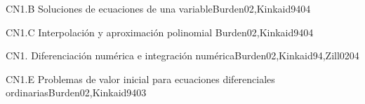 \begin{syllabus}
\begin{unit}{CN1.B Soluciones de ecuaciones de una variable}{Burden02,Kinkaid94}{0}{4}
\begin{topics}
      \item \CNONETopicIterative
   \end{topics}
   \begin{learningoutcomes}
      \item \CNONEObjONE
      \item \CNONEObjTWO
      \item \CNONEObjTHREE
      \item \CNONEObjFOUR
   \end{learningoutcomes}
\end{unit}

\begin{unit}{CN1.C Interpolación y aproximación polinomial }{Burden02,Kinkaid94}{0}{4}
\begin{topics}
      \item \CNONETopicCurve
   \end{topics}

   \begin{learningoutcomes}
      \item \CNONEObjONE
      \item \CNONEObjTWO
      \item \CNONEObjTHREE
      \item \CNONEObjFOUR
   \end{learningoutcomes}
\end{unit}

\begin{unit}{CN1. Diferenciación numérica e integración numérica}{Burden02,Kinkaid94,Zill02}{0}{4}
\begin{topics}
      \item \CNONETopicNumerical
      \item \CNONETopicExplicit
   \end{topics}

   \begin{learningoutcomes}
      \item \CNONEObjONE
      \item \CNONEObjTWO
      \item \CNONEObjTHREE
      \item \CNONEObjFOUR
   \end{learningoutcomes}
\end{unit}

\begin{unit}{CN1.E Problemas de valor inicial para ecuaciones diferenciales ordinarias}{Burden02,Kinkaid94}{0}{3}
\begin{topics}
      \item \CNONETopicDifferential
   \end{topics}


\end{unit}
\end{syllabus}

